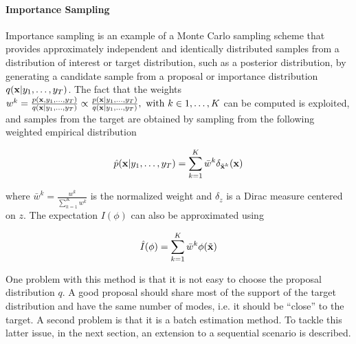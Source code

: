 \paragraph{Importance Sampling}
Importance sampling is an example of a Monte Carlo sampling scheme that provides approximately independent and identically distributed samples from a distribution of interest or target distribution, such as a posterior distribution, by generating a candidate sample from a proposal or importance distribution $q(\boldsymbol{\mathbf{x}}|y_1,\dots,y_T)$.
The fact that the weights 
$w^k = \frac{p(\boldsymbol{\mathbf{x}}, y_1,\dots,y_T)}{q(\boldsymbol{\mathbf{x}}|y_1,\dots,y_T)} \propto \frac{p(\boldsymbol{\mathbf{x}}|y_1,\dots,y_T)}{q(\boldsymbol{\mathbf{x}}|y_1,\dots,y_T)}, \ \text{with} \ k \in 1,\dots,K$ can be computed is exploited, and samples from the target are obtained by sampling from the following weighted empirical distribution

$$ \hat{p}(\boldsymbol{\mathbf{x}}|y_1,\dots,y_T) = \sum_{k=1}^K \bar{w}^k \delta_{\tilde{\boldsymbol{\mathbf{x}}}^k} (\boldsymbol{\mathbf{x}})$$

where $\bar{w}^k = \frac{{w}^k}{\sum_{k=1}^K {w}^k}$ is the normalized weight and
$\delta_{z}$ is a Dirac measure centered on $z$.
The expectation $I(\phi)$ can also be approximated using

$$ \hat{I}(\phi) = \sum_{k=1}^K \bar{w}^k \phi(\tilde{\boldsymbol{\mathbf{x}}})$$


One problem with this method is that it is not easy to choose the proposal distribution $q$. A good proposal should share most of the support of the target distribution and have the same number of modes, i.e. it should be “close” to the target. A second problem is that it is a batch estimation method. To tackle this latter issue, in the next section, an extension to a sequential scenario is described.

